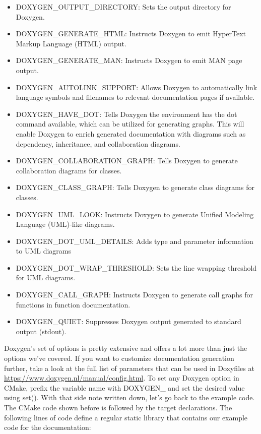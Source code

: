 \begin{itemize}
\item 
DOXYGEN\_OUTPUT\_DIRECTORY: Sets the output directory for Doxygen.

\item 
DOXYGEN\_GENERATE\_HTML: Instructs Doxygen to emit HyperText Markup Language (HTML) output.

\item 
DOXYGEN\_GENERATE\_MAN: Instructs Doxygen to emit MAN page output.

\item 
DOXYGEN\_AUTOLINK\_SUPPORT: Allows Doxygen to automatically link language symbols and filenames to relevant documentation pages if available.

\item 
DOXYGEN\_HAVE\_DOT: Tells Doxygen the environment has the dot command available, which can be utilized for generating graphs. This will enable Doxygen to  enrich generated documentation with diagrams such as dependency, inheritance, and collaboration diagrams.

\item 
DOXYGEN\_COLLABORATION\_GRAPH: Tells Doxygen to generate collaboration diagrams for classes.

\item 
DOXYGEN\_CLASS\_GRAPH: Tells Doxygen to generate class diagrams for classes.

\item 
DOXYGEN\_UML\_LOOK: Instructs Doxygen to generate Unified Modeling Language (UML)-like diagrams.

\item 
DOXYGEN\_DOT\_UML\_DETAILS: Adds type and parameter information to UML diagrams

\item 
DOXYGEN\_DOT\_WRAP\_THRESHOLD: Sets the line wrapping threshold for UML diagrams.

\item 
DOXYGEN\_CALL\_GRAPH: Instructs Doxygen to generate call graphs for functions in function documentation.

\item 
DOXYGEN\_QUIET: Suppresses Doxygen output generated to standard output (stdout).
\end{itemize}

Doxygen's set of options is pretty extensive and offers a lot more than just the options we've covered. If you want to customize documentation generation further, take a look at the full list of parameters that can be used in Doxyfiles at \url{https://www.doxygen.nl/manual/config.html}. To set any Doxygen option in CMake, prefix the variable name with DOXYGEN\_ and set the desired value using set(). With that side note written down, let's go back to the example code. The CMake code shown before is followed by the target declarations. The following lines of code define a regular static library that contains our example code for the documentation:

